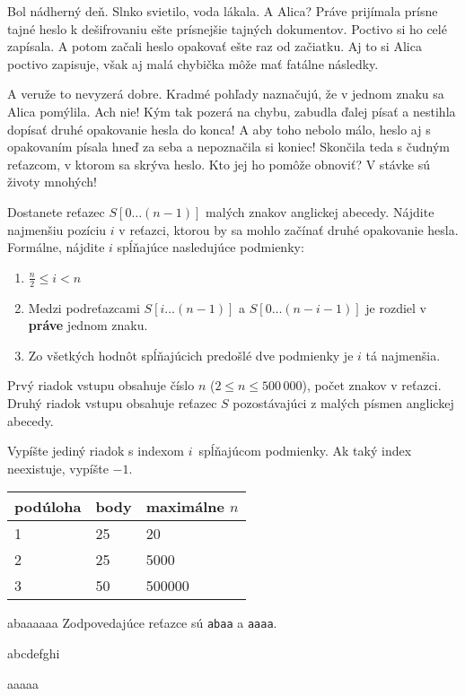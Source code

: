 
\usepackage[slovak]{babel}





Bol nádherný deň. Slnko svietilo, voda lákala. A Alica? Práve prijímala prísne
tajné heslo k dešifrovaniu ešte prísnejšie tajných dokumentov. Poctivo si ho
celé zapísala. A potom začali heslo opakovať ešte raz od začiatku. Aj to si Alica
poctivo zapisuje, však aj malá chybička môže mať fatálne následky.

A veruže to nevyzerá dobre. Kradmé pohľady naznačujú, že v jednom znaku sa Alica
pomýlila. Ach nie! Kým tak pozerá na chybu, zabudla ďalej písať a nestihla dopísať
druhé opakovanie hesla do konca! A aby toho nebolo málo, heslo aj s opakovaním
písala hneď za seba a nepoznačila si koniec! Skončila teda s čudným reťazcom, v
ktorom sa skrýva heslo. Kto jej ho pomôže obnoviť? V stávke sú životy mnohých!


Dostanete reťazec $S[0 \ldots (n-1)]$ malých znakov anglickej abecedy. Nájdite najmenšiu pozíciu $i$
v reťazci, ktorou by sa mohlo začínať druhé opakovanie hesla. Formálne, nájdite $i$ spĺňajúce
nasledujúce podmienky:

\begin{enumerate}
    \item $\frac{n}{2} \leq i < n$
    \item Medzi podreťazcami $S[i \ldots (n-1)]$ a $S[0 \ldots (n - i - 1)]$ je
    rozdiel v \textbf{práve} jednom znaku.
    \item Zo všetkých hodnôt spĺňajúcich predošlé dve podmienky je $i$ tá najmenšia.
\end{enumerate}


Prvý riadok vstupu obsahuje číslo $n$ ($2 \leq n \leq 500\,000$), počet znakov v reťazci.
Druhý riadok vstupu obsahuje reťazec $S$ pozostávajúci z malých písmen anglickej abecedy.


Vypíšte jediný riadok s indexom $i$ spĺňajúcom podmienky. Ak taký index neexistuje,
vypíšte $-1$.


\centering
\begin{tabular}{|l|l|l|}
\hline
podúloha & body & maximálne $n$  \\ \hline
1       & 25     & 20           \\ \hline
2       & 25     & 5000         \\ \hline
3       & 50     & 500000       \\ \hline
\end{tabular}




abaaaaaa
\sampleCOMMENT
Zodpovedajúce reťazce sú \texttt{abaa} a \texttt{aaaa}.
\sampleEND


\bigskip


abcdefghi
\sampleEND

\bigskip

aaaaa
\sampleEND


